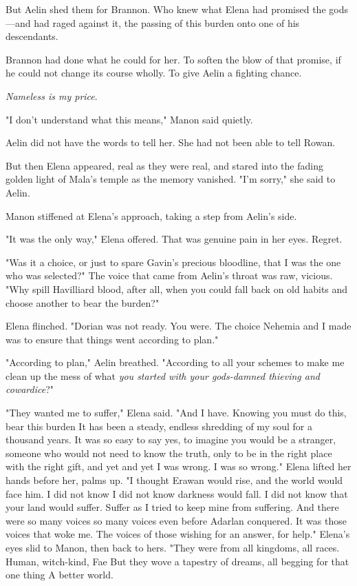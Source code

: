 But Aelin shed them for Brannon. Who knew what Elena had promised the gods---and had raged against it, the passing of this burden onto one of his descendants.

Brannon had done what he could for her. To soften the blow of that promise, if he could not change its course wholly. To give Aelin a fighting chance.

\emph{Nameless is my price}.

"I don't understand what this means," Manon said quietly.

Aelin did not have the words to tell her. She had not been able to tell Rowan.

But then Elena appeared, real as they were real, and stared into the fading golden light of Mala's temple as the memory vanished. "I'm sorry," she said to Aelin.

Manon stiffened at Elena's approach, taking a step from Aelin's side.

"It was the only way," Elena offered. That was genuine pain in her eyes. Regret.

"Was it a choice, or just to spare Gavin's precious bloodline, that I was the one who was selected?" The voice that came from Aelin's throat was raw, vicious. "Why spill Havilliard blood, after all, when you could fall back on old habits and choose another to bear the burden?"

Elena flinched. "Dorian was not ready. You were. The choice Nehemia and I made was to ensure that things went according to plan."

"According to plan," Aelin breathed. "According to all your schemes to make me clean up the mess of what \emph{you started with your gods-damned thieving and cowardice}?"

"They wanted me to suffer," Elena said. "And I have. Knowing you must do this, bear this burden  It has been a steady, endless shredding of my soul for a thousand years. It was so easy to say yes, to imagine you would be a stranger, someone who would not need to know the truth, only to be in the right place with the right gift, and yet
 and yet I was wrong. I was so wrong." Elena lifted her hands before her, palms up. "I thought Erawan would rise, and the world would face him. I did not know  I did not know darkness would fall. I did not know that your land would suffer. Suffer as I tried to keep mine from suffering. And there were so many voices  so many voices even before Adarlan conquered. It was those voices that woke me. The voices of those wishing for an answer, for help." Elena's eyes slid to Manon, then back to hers. "They were from all kingdoms, all races. Human, witch-kind, Fae  But they wove a tapestry of dreams, all begging for that one thing  A better world.


